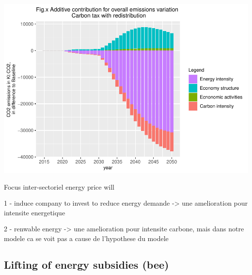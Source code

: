 \documentclass[
]{article}
\begin{document}
\includegraphics{Modele-ThreeMe-Tunisie_Sequeira_Valilou_Wang_files/figure-latex/unnamed-chunk-17-1.pdf}

Focus inter-sectoriel energy price will

1 - induce company to invest to reduce energy demande -\textgreater{}
une amelioration pour intensite energetique

2 - renwable energy -\textgreater{} une amelioration pour intensite
carbone, mais dans notre modele ca se voit pas a cause de l'hypothese du
modele

\hypertarget{lifting-of-energy-subsidies-bee}{%
\subsection{Lifting of energy subsidies
(bee)}\label{lifting-of-energy-subsidies-bee}}
\end{document}
